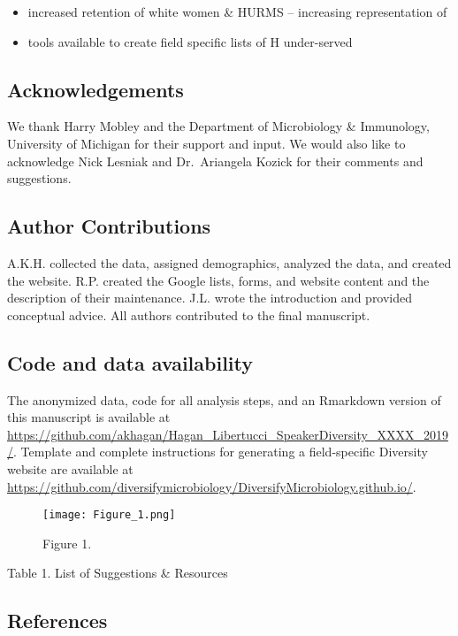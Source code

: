 \documentclass[10pt,]{article}
\providecommand{\tightlist}{%
  \setlength{\itemsep}{0pt}\setlength{\parskip}{0pt}}
\begin{document}
\begin{itemize}
\tightlist
\item
  increased retention of white women \& HURMS -- increasing
  representation of
\item
  tools available to create field specific lists of H under-served
\end{itemize}

\subsection{Acknowledgements}\label{acknowledgements}

We thank Harry Mobley and the Department of Microbiology \& Immunology,
University of Michigan for their support and input. We would also like
to acknowledge Nick Lesniak and Dr.~Ariangela Kozick for their comments
and suggestions.

\subsection{Author Contributions}\label{author-contributions}

A.K.H. collected the data, assigned demographics, analyzed the data, and
created the website. R.P. created the Google lists, forms, and website
content and the description of their maintenance. J.L. wrote the
introduction and provided conceptual advice. All authors contributed to
the final manuscript.

\subsection{Code and data
availability}\label{code-and-data-availability}

The anonymized data, code for all analysis steps, and an Rmarkdown
version of this manuscript is available at
\url{https://github.com/akhagan/Hagan_Libertucci_SpeakerDiversity_XXXX_2019/}.
Template and complete instructions for generating a field-specific
Diversity website are available at
\url{https://github.com/diversifymicrobiology/DiversifyMicrobiology.github.io/}.

\begin{figure}
\centering
\texttt{[image: Figure\_1.png]}
\caption{Figure 1.}
\end{figure}

Table 1. List of Suggestions \& Resources

\subsection{References}\label{references}

\hypertarget{refs}{}
\end{document}
